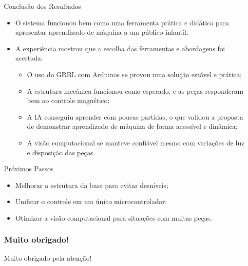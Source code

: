 \documentclass{beamer}
\begin{document}
\begin{frame}{Conclusão dos Resultados}
  \begin{itemize}
    \item O sistema funcionou bem como uma ferramenta prática e didática para apresentar aprendizado de máquina a um público infantil.

\item A experiência mostrou que a escolha das ferramentas e abordagens foi acertada:
\begin{itemize}
  \item O uso do GRBL com Arduinos se provou uma solução estável e prática;
  \item A estrutura mecânica funcionou como esperado, e as peças responderam bem ao controle magnético;
  \item A IA conseguiu aprender com poucas partidas, o que validou a proposta de demonstrar aprendizado de máquina de forma acessível e dinâmica;
  \item A visão computacional se manteve confiável mesmo com variações de luz e disposição das peças.
\end{itemize}

  \end{itemize}
\end{frame}


\begin{frame}{Próximos Passos}
  \begin{itemize}
    \item Melhorar a estrutura da base para evitar desníveis;
    \item Unificar o controle em um único microcontrolador;
    \item Otimizar a visão computacional para situações com muitas peças.
  \end{itemize}
\end{frame}




\begin{frame}[plain]
  \frametitle{Muito obrigado!}

  \vspace{1.5cm}
  \centering
  \Huge Muito obrigado pela atenção!

\end{frame}
\end{document}
